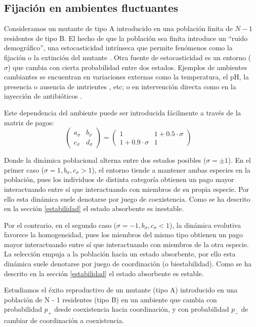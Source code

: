 \documentclass[%
 sor,
 jor,
 amsmath,amssymb,
 reprint,%
]{revtex4-2}
\begin{document}
\subsection{Fijación en ambientes fluctuantes}


Consideramos un mutante de tipo A introducido en una población finita de $N - 1$ residentes de tipo B. El hecho de que la población sea finita introduce un ``ruido demográfico'', una estocasticidad intrínseca que permite fenómenos como la fijación o la extinción del mutante \cite{BaronGalla2016}.
Otra fuente de estocasticidad es un entorno ($\sigma$) que cambia con cierta probabilidad entre dos estados. Ejemplos de ambientes cambiantes se encuentran en variaciones externas como la temperatura, el pH, la presencia o ausencia de nutrientes \cite{10.1371/journal.pcbi.1003826}, etc; o en intervención directa como en la inyección de antibióticos \cite{Kussell2005}.

Este dependencia del ambiente puede ser introducida fácilmente a través de la matriz de pagos:
\[
\begin{pmatrix}
a_\sigma & b_\sigma \\
c_\sigma & d_\sigma
\end{pmatrix}
=
\begin{pmatrix}
1 & 1 + 0.5 \cdot \sigma \\
1 + 0.9 \cdot \sigma & 1
\end{pmatrix}
\]

Donde la dinámica poblacional alterna entre dos estados posibles ($\sigma = \pm 1$). En el primer caso ($\sigma = 1, b_\sigma, c_\sigma > 1$), el entorno tiende a mantener ambas especies en la población, pues los individuos de distinta categoría obtienen un pago mayor interactuando entre sí que interactuando con miembros de su propia especie. Por ello esta dinámica suele denotarse por juego de coexistencia. Como se ha descrito en la sección \ref{estabilidad} el estado absorbente es inestable.

Por el contrario, en el segundo caso ($\sigma = -1, b_\sigma, c_\sigma < 1$), la dinámica evolutiva favorece la homogeneidad, pues los miembros del mismo tipo obtienen un pago mayor interactuando entre sí que interactuando con miembros de la otra especie. La selección empuja a la población hacia un estado absorbente, por ello esta dinámica suele denotarse por juego de coordinación (o biestabilidad).  Como se ha descrito en la sección \ref{estabilidad} el estado absorbente es estable.

Estudiamos el éxito reproductivo de un mutante (tipo A) introducido en una población de N - 1 residentes (tipo B) en un ambiente que cambia con probabilidad $p_+$ desde coexistencia hacia coordinación, y con probabilidad $p_-$ de cambiar de coordinación a coexistencia. 
\end{document}
